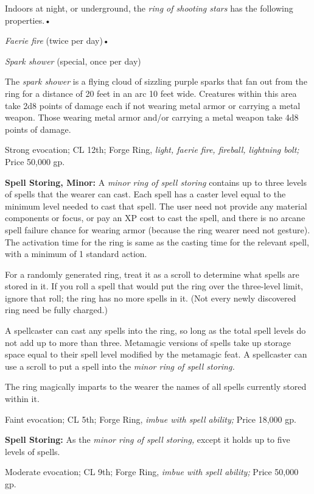\documentclass{article}
\begin{document}
Indoors at night, or underground, the \textit{ring of shooting stars }has the following 
properties.• 

\textit{Faerie fire }(twice per day)• 

\textit{Spark shower }(special, once per day)

The \textit{spark shower }is a flying cloud of sizzling purple sparks that fan 
out from the ring for a distance of 20 feet in an arc 10 feet wide. Creatures within 
this area take 2d8 points of damage each if not wearing metal armor or carrying 
a metal weapon. Those wearing metal armor and/or carrying a metal weapon take 4d8 
points of damage.

Strong evocation; CL 12th; Forge Ring, \textit{light, faerie fire, fireball, lightning 
bolt; }Price 50,000 gp.

\textbf{Spell Storing, Minor:} A \textit{minor ring of spell storing }contains 
up to three levels of spells that the wearer can cast. Each spell has a caster 
level equal to the minimum level needed to cast that spell. The user need not provide 
any material components or focus, or pay an XP cost to cast the spell, and there 
is no arcane spell failure chance for wearing armor (because the ring wearer need 
not gesture). The activation time for the ring is same as the casting time for 
the relevant spell, with a minimum of 1 standard action.

For a randomly generated ring, treat it as a scroll to determine what spells are 
stored in it. If you roll a spell that would put the ring over the three-level 
limit, ignore that roll; the ring has no more spells in it. (Not every newly discovered 
ring need be fully charged.)

A spellcaster can cast any spells into the ring, so long as the total spell levels 
do not add up to more than three. Metamagic versions of spells take up storage 
space equal to their spell level modified by the metamagic feat. A spellcaster 
can use a scroll to put a spell into the \textit{minor ring of spell storing.}

The ring magically imparts to the wearer the names of all spells currently stored 
within it.

Faint evocation; CL 5th; Forge Ring, \textit{imbue with spell ability; }Price 18,000 
gp.

\textbf{Spell Storing:} As the \textit{minor ring of spell storing, }except it 
holds up to five levels of spells.

Moderate evocation; CL 9th; Forge Ring, \textit{imbue with spell ability; }Price 
50,000 gp.
\end{document}
